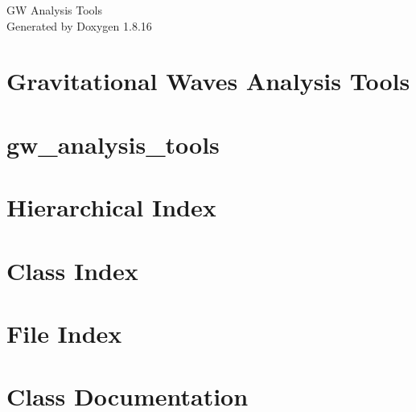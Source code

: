 \let\mypdfximage\pdfximage\def\pdfximage{\immediate\mypdfximage}\documentclass[twoside]{book}
\newcommand{\+}{\discretionary{\mbox{\scriptsize$\hookleftarrow$}}{}{}}
\newcommand{\clearemptydoublepage}{%
  \newpage{\pagestyle{empty}\cleardoublepage}%
}
\begin{document}
\hypersetup{pageanchor=false,
             bookmarksnumbered=true,
             pdfencoding=unicode
            }
\begin{titlepage}
\vspace*{7cm}
\begin{center}%
{\Large GW Analysis Tools }\\
\vspace*{1cm}
{\large Generated by Doxygen 1.8.16}\\
\end{center}
\end{titlepage}
\clearemptydoublepage
{}
\tableofcontents
\clearemptydoublepage
{}
\hypersetup{pageanchor=true}

\chapter{Gravitational Waves Analysis Tools}
\label{index}\hypertarget{index}{}
\chapter{gw\+\_\+analysis\+\_\+tools}
\label{md_README}

\chapter{Hierarchical Index}

\chapter{Class Index}

\chapter{File Index}

\chapter{Class Documentation}



































\end{document}
